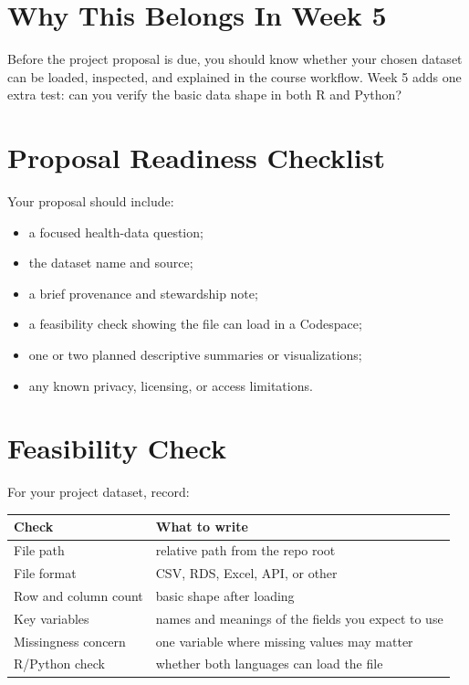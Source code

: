 \documentclass[
  letterpaper,
  DIV=11,
  numbers=noendperiod,
  oneside]{scrreprt}
\providecommand{\tightlist}{%
  \setlength{\itemsep}{0pt}\setlength{\parskip}{0pt}}
\begin{document}
\section{Why This Belongs In Week 5}\label{why-this-belongs-in-week-5}

Before the project proposal is due, you should know whether your chosen
dataset can be loaded, inspected, and explained in the course workflow.
Week 5 adds one extra test: can you verify the basic data shape in both
R and Python?

\section{Proposal Readiness
Checklist}\label{proposal-readiness-checklist}

Your proposal should include:

\begin{itemize}
\tightlist
\item
  a focused health-data question;
\item
  the dataset name and source;
\item
  a brief provenance and stewardship note;
\item
  a feasibility check showing the file can load in a Codespace;
\item
  one or two planned descriptive summaries or visualizations;
\item
  any known privacy, licensing, or access limitations.
\end{itemize}

\section{Feasibility Check}\label{feasibility-check}

For your project dataset, record:

\begin{longtable}[]{@{}ll@{}}
\toprule\noalign{}
Check & What to write \\
\midrule\noalign{}
\endhead
\bottomrule\noalign{}
\endlastfoot
File path & relative path from the repo root \\
File format & CSV, RDS, Excel, API, or other \\
Row and column count & basic shape after loading \\
Key variables & names and meanings of the fields you expect to use \\
Missingness concern & one variable where missing values may matter \\
R/Python check & whether both languages can load the file \\
\end{longtable}
\end{document}
